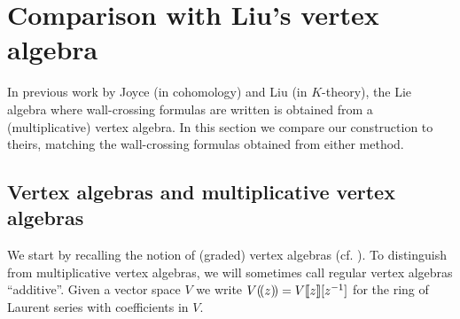 \documentclass[12pt]{amsart}
\theoremstyle{definition}
\newcommand{\1}{\mathbf 1}
\newcommand{\lpp}{(\hspace{-0.15em}(}
\newcommand{\rpp}{)\hspace{-0.15em})}
\begin{document}
\section{Comparison with Liu's vertex algebra}\label{sec:Liuvert}



In previous work by Joyce \cite{joyce} (in cohomology) and Liu \cite{Liu} (in $K$-theory), the Lie algebra where wall-crossing formulas are written is obtained from a (multiplicative) vertex algebra. In this section we compare our construction to theirs, matching the wall-crossing formulas obtained from either method.


\subsection{Vertex algebras and multiplicative vertex algebras}\label{subsec: multiplivativeva}

We start by recalling the notion of (graded) vertex algebras (cf. \cite{FB-Z, Ka98, liFVA, LLVA, joyce}). To distinguish from multiplicative vertex algebras, we will sometimes call regular vertex algebras ``additive''.  Given a vector space $V$ we write $V\lpp z\rpp=V\llbracket z \rrbracket[z^{-1}]$ for the ring of Laurent series with coefficients in $V$.
\end{document}
